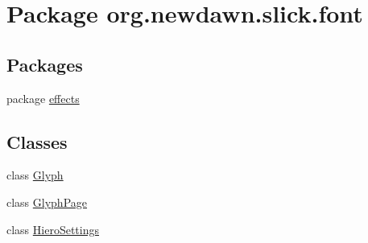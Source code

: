 \hypertarget{namespaceorg_1_1newdawn_1_1slick_1_1font}{}\section{Package org.\+newdawn.\+slick.\+font}
\label{namespaceorg_1_1newdawn_1_1slick_1_1font}
\subsection*{Packages}
\begin{DoxyCompactItemize}
\item 
package \mbox{\hyperlink{namespaceorg_1_1newdawn_1_1slick_1_1font_1_1effects}{effects}}
\end{DoxyCompactItemize}
\subsection*{Classes}
\begin{DoxyCompactItemize}
\item 
class \mbox{\hyperlink{classorg_1_1newdawn_1_1slick_1_1font_1_1_glyph}{Glyph}}
\item 
class \mbox{\hyperlink{classorg_1_1newdawn_1_1slick_1_1font_1_1_glyph_page}{Glyph\+Page}}
\item 
class \mbox{\hyperlink{classorg_1_1newdawn_1_1slick_1_1font_1_1_hiero_settings}{Hiero\+Settings}}
\end{DoxyCompactItemize}
